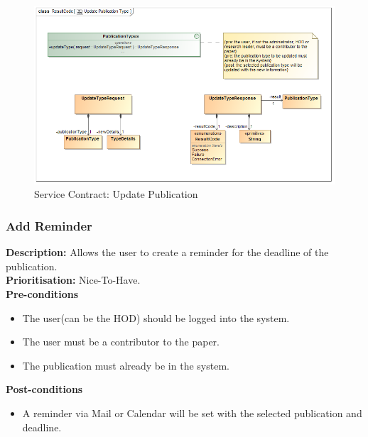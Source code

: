 \documentclass[a4paper]{article}
\begin{document}
                \begin{figure}[H]
                	\centering
                	\includegraphics[width=\textwidth]{../Assignment1/5.1.9.Update.Publication.Type.Services.Contract.png}
                	\caption{Service Contract: Update Publication}
                \end{figure}
        
        \pagebreak
    \subsubsection{Add Reminder}
            \textbf{Description:} Allows the user to create a reminder for the deadline of the publication.\\
            \textbf{Prioritisation:} Nice-To-Have.
            \\
            
            \textbf{Pre-conditions}
            \begin{itemize}
            	\item The user(can be the HOD) should be logged into the system.
            	\item The user must be a contributor to the paper.
            	\item The publication must already be in the system.
            \end{itemize}
            
            \textbf{Post-conditions}
            \begin{itemize}
            	\item A reminder via Mail or Calendar will be set with the selected publication and deadline.
            \end{itemize}
            
\end{document}
